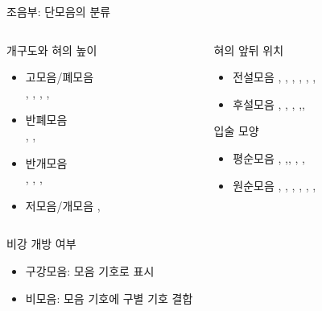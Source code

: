 \documentclass[11pt, aspectratio=169]{beamer}
\newcommand{\textds}[1]{{\ipafont #1}}
\begin{document}
\begin{frame}[t]{조음부: 단모음의 분류}
    \begin{columns}
        \begin{column}[T]{0.36\textwidth}
            \begin{block}{개구도와 혀의 높이}
                \begin{itemize}
                    \item 고모음/폐모음 \\ \textds{[i]}, \textds{[y]}, \textds{[ɨ]}, \textds{[ʉ]} \textds{[ɯ]}, \textds{[u]}
                    \item 반폐모음 \\ \textds{[e]}, \textds{[ø]}, \textds{[o]}
                    \item 반개모음 \\ \textds{[ɛ]}, \textds{[œ]}, \textds{[ʌ]},\textds{[ɔ]}
                    \item 저모음/개모음 \textds{[a]}, \textds{[ɒ]}
                \end{itemize}
            \end{block}
        \end{column}
        \begin{column}[T]{0.57\textwidth}
            \begin{block}{혀의 앞뒤 위치}
                \begin{itemize}
                    \item 전설모음 \textds{[i]}, \textds{[y]}, \textds{[e]}, \textds{[ø]}, \textds{[ɛ]}, \textds{[œ]}, \textds{[a]}
                    \item 후설모음 \textds{[ɯ]}, \textds{[u]}, \textds{[o]}, \textds{[ʌ]},\textds{[ɔ]}, \textds{[ɒ]}
                \end{itemize}
            \end{block}
            \begin{block}{입술 모양}
                \begin{itemize}
                    \item 평순모음 \textds{[i]}, \textds{[e]},\textds{[ɛ]}, \textds{[a]}, \textds{[ɯ]}, \textds{[ʌ]}
                    \item 원순모음 \textds{[y]}, \textds{[ø]}, \textds{[œ]}, \textds{[u]}, \textds{[o]}, \textds{[ɔ]}, \textds{[ɒ]}
                \end{itemize}
            \end{block}
        \end{column}
    \end{columns}
    \begin{block}{비강 개방 여부}
        \begin{itemize}
            \item 구강모음: 모음 기호로 표시
            \item 비모음: 모음 기호에 \textds{[  ̃ ]} 구별 기호 결합
        \end{itemize}
    \end{block}
\end{frame}
\end{document}
